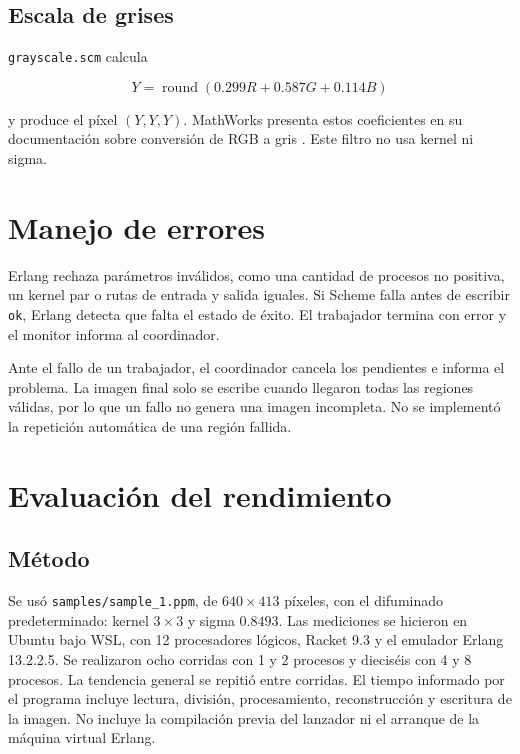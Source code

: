 \documentclass[11pt]{article}
\begin{document}
\subsection{Escala de grises}

\texttt{grayscale.scm} calcula

\begin{equation}
    Y=\operatorname{round}(0.299R+0.587G+0.114B)
\end{equation}

y produce el píxel $(Y,Y,Y)$. MathWorks presenta estos coeficientes en su
documentación sobre conversión de RGB a gris \cite{mathworks-grayscale}.
Este filtro no usa kernel ni sigma.

\section{Manejo de errores}

Erlang rechaza parámetros inválidos, como una cantidad de procesos no
positiva, un kernel par o rutas de entrada y salida iguales. Si Scheme falla
antes de escribir \texttt{ok}, Erlang detecta que falta el estado de éxito.
El trabajador termina con error y el monitor informa al coordinador.

Ante el fallo de un trabajador, el coordinador cancela los pendientes e
informa el problema. La imagen final solo se escribe cuando llegaron todas
las regiones válidas, por lo que un fallo no genera una imagen incompleta.
No se implementó la repetición automática de una región fallida.

\section{Evaluación del rendimiento}

\subsection{Método}

Se usó \texttt{samples/sample\_1.ppm}, de $640\times413$ píxeles, con el
difuminado predeterminado: kernel $3\times3$ y sigma $0.8493$. Las mediciones
se hicieron en Ubuntu bajo WSL, con 12 procesadores lógicos, Racket 9.3 y el
emulador Erlang 13.2.2.5. Se realizaron ocho corridas con 1 y 2 procesos y
dieciséis con 4 y 8 procesos. La tendencia general se repitió entre corridas.
El tiempo informado por el programa incluye lectura, división, procesamiento,
reconstrucción y escritura de la imagen. No incluye la compilación previa
del lanzador ni el arranque de la máquina virtual Erlang.
\end{document}
